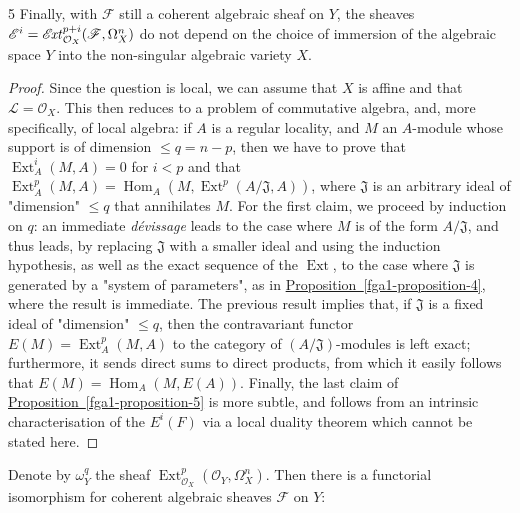 \begin{proposition}{5}
    Finally, with \(\mathscr {F}\) still a coherent algebraic sheaf on \(Y\), the sheaves \(\mathscr {E}^i=\mathscr {E}\kern  -1.5pt\mathit {xt}_{\mathcal {O}_X}^{p+i}(\mathscr {F},\Omega _X^n)\) do not depend on the choice of immersion of the algebraic space \(Y\) into the non-singular algebraic variety \(X\).\begin{proof}\par{}Since the question is local, we can assume that \(X\) is affine and that \(\mathscr {L}=\mathcal {O}_X\).
      This then reduces to a problem of commutative algebra, and, more specifically, of local algebra:
      if \(A\) is a regular locality, and \(M\) an \(A\)-module whose support is of dimension \(\leqslant  q=n-p\), then we have to prove that \(\operatorname {Ext}_A^i(M,A)=0\) for \(i<p\) and that \(\operatorname {Ext}_A^p(M,A)=\operatorname {Hom}_A(M,\operatorname {Ext}^p(A/\mathfrak {J},A))\), where \(\mathfrak {J}\) is an arbitrary ideal of "dimension" \(\leqslant  q\) that annihilates \(M\).
      For the first claim, we proceed by induction on \(q\):
      an immediate \emph{dévissage} leads to the case where \(M\) is of the form \(A/\mathfrak {J}\), and thus leads, by replacing \(\mathfrak {J}\) with a smaller ideal and using the induction hypothesis, as well as the exact sequence of the \(\operatorname {Ext}\), to the case where \(\mathfrak {J}\) is generated by a "system of parameters", as in \hyperref[fga1-proposition-4]{Proposition~\ref*{fga1-proposition-4}}, where the result is immediate.
      The previous result implies that, if \(\mathfrak {J}\) is a fixed ideal of "dimension" \(\leqslant  q\), then the contravariant functor \(E(M)=\operatorname {Ext}_A^p(M,A)\) to the category of \((A/\mathfrak {J})\)-modules is left exact;
      furthermore, it sends direct sums to direct products, from which it easily follows that \(E(M)=\operatorname {Hom}_A(M,E(A))\).
      Finally, the last claim of \hyperref[fga1-proposition-5]{Proposition~\ref*{fga1-proposition-5}} is more subtle, and follows from an intrinsic characterisation of the \(E^i(F)\) via a local duality theorem which cannot be stated here.\end{proof}\end{proposition}\begin{corollary}{}\label{fga1-proposition-5-corollary}\skipsinglepar\par{}Denote by \(\omega _Y^q\) the sheaf \(\operatorname {Ext}_{\mathcal {O}_X}^p(\mathcal {O}_Y,\Omega _X^n)\).
    Then there is a functorial isomorphism for coherent algebraic sheaves \(\mathscr {F}\) on \(Y\):


\end{corollary}
